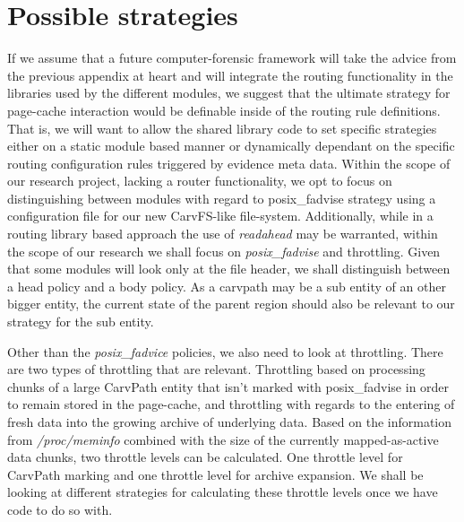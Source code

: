 \section{Possible strategies}
If we assume that a future computer-forensic framework will take the advice from the previous appendix at heart and will integrate the routing functionality in the libraries used by the different modules, we suggest that the ultimate strategy for page-cache interaction would be definable inside of the routing rule definitions. That is, we will want to allow the shared library code to set specific strategies either on a static module based manner or dynamically dependant on the specific routing configuration rules triggered by evidence meta data. Within the scope of our research project, lacking a router functionality, we opt to focus on distinguishing between modules with regard to posix\_fadvise strategy using a configuration file for our new CarvFS-like file-system. Additionally, while in a routing library based approach the use of \emph{readahead} may be warranted, within the scope of our research we shall focus on \emph{posix\_fadvise} and throttling. Given that some modules will look only at the file header, we shall distinguish between a head policy and a body policy. As a carvpath may be a sub entity of an other bigger entity, the current state of the parent region should also be relevant to our strategy for the sub entity. 

Other than the \emph{posix\_fadvice} policies, we also need to look at throttling. 
There are two types of throttling that are relevant. Throttling based on processing chunks of a large CarvPath entity that isn't marked  with posix\_fadvise in order to remain stored in the page-cache, and throttling with regards to the entering of fresh data into the growing archive of underlying data. Based on the information from \emph{/proc/meminfo} combined with the size of the currently mapped-as-active data chunks, two throttle levels can be calculated. One throttle level for CarvPath marking and one throttle level for archive expansion.  We shall be looking at different strategies for calculating these throttle levels once we have code to do so with. 
